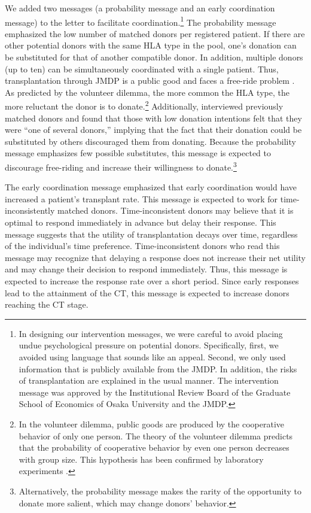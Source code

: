 \documentclass[12pt, a4paper]{article}
\begin{document}
We added two messages (a probability message and an early coordination message) to the letter to facilitate coordination.\footnote{In designing our intervention messages, we were careful to avoid placing undue psychological pressure on potential donors. Specifically, first, we avoided using language that sounds like an appeal. Second, we only used information that is publicly available from the JMDP. In addition, the risks of transplantation are explained in the usual manner. The intervention message was approved by the Institutional Review Board of the Graduate School of Economics of Osaka University and the JMDP.} The probability message emphasized the low number of matched donors per registered patient. If there are other potential donors with the same HLA type in the pool, one's donation can be substituted for that of another compatible donor. In addition, multiple donors (up to ten) can be simultaneously coordinated with a single patient. Thus, transplantation through JMDP is a public good and faces a free-ride problem \citep{Bergstrom2009}. As predicted by the volunteer dilemma, the more common the HLA type, the more reluctant the donor is to donate.\footnote{In the volunteer dilemma, public goods are produced by the cooperative behavior of only one person. The theory of the volunteer dilemma predicts that the probability of cooperative behavior by even one person decreases with group size. This hypothesis has been confirmed by laboratory experiments \citep{Diekmann1985, Diekmann1986, Franzen1999, Davis2017}.} Additionally, \citet{Kurosawa2022} interviewed previously matched donors and found that those with low donation intentions felt that they were ``one of several donors,'' implying that the fact that their donation could be substituted by others discouraged them from donating. Because the probability message emphasizes few possible substitutes, this message is expected to discourage free-riding and increase their willingness to donate.\footnote{Alternatively, the probability message makes the rarity of the opportunity to donate more salient, which may change donors' behavior.}

The early coordination message emphasized that early coordination would have increased a patient's transplant rate. This message is expected to work for time-inconsistently matched donors. Time-inconsistent donors may believe that it is optimal to respond immediately in advance but delay their response. This message suggests that the utility of transplantation decays over time, regardless of the individual's time preference. Time-inconsistent donors who read this message may recognize that delaying a response does not increase their net utility and may change their decision to respond immediately. Thus, this message is expected to increase the response rate over a short period. Since early responses lead to the attainment of the CT, this message is expected to increase donors reaching the CT stage.
\end{document}

